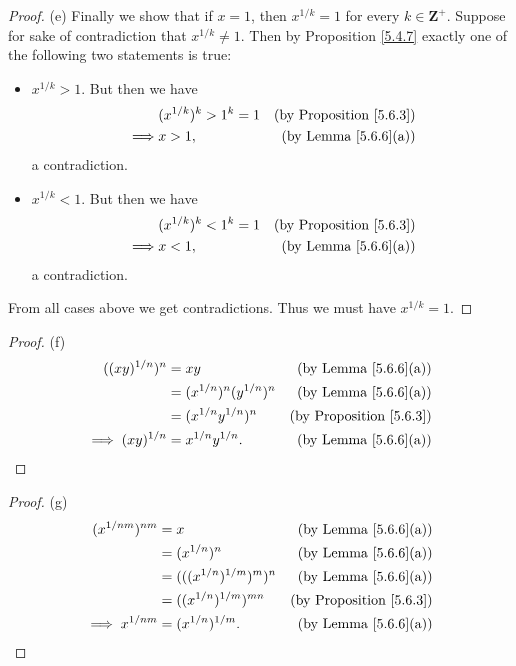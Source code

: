 \begin{proof}{(e)}
    Finally we show that if \(x = 1\), then \(x^{1 / k} = 1\) for every \(k \in \mathbf{Z}^+\).
    Suppose for sake of contradiction that \(x^{1 / k} \neq 1\).
    Then by Proposition \ref{5.4.7} exactly one of the following two statements is true:
    \begin{itemize}
        \item \(x^{1 / k} > 1\).
              But then we have
              \begin{align*}
                           & (x^{1 / k})^k > 1^k = 1 & \text{(by Proposition \ref{5.6.3})} \\
                  \implies & x > 1,                  & \text{(by Lemma \ref{5.6.6}(a))}
              \end{align*}
              a contradiction.
        \item \(x^{1 / k} < 1\).
              But then we have
              \begin{align*}
                           & (x^{1 / k})^k < 1^k = 1 & \text{(by Proposition \ref{5.6.3})} \\
                  \implies & x < 1,                  & \text{(by Lemma \ref{5.6.6}(a))}
              \end{align*}
              a contradiction.
    \end{itemize}
    From all cases above we get contradictions.
    Thus we must have \(x^{1 / k} = 1\).
\end{proof}

\begin{proof}{(f)}
    \begin{align*}
        ((xy)^{1 / n})^n      & = xy                          & \text{(by Lemma \ref{5.6.6}(a))}    \\
                              & = (x^{1 / n})^n (y^{1 / n})^n & \text{(by Lemma \ref{5.6.6}(a))}    \\
                              & = (x^{1 / n} y^{1 / n})^n     & \text{(by Proposition \ref{5.6.3})} \\
        \implies (xy)^{1 / n} & = x^{1 / n} y^{1 / n}.        & \text{(by Lemma \ref{5.6.6}(a))}
    \end{align*}
\end{proof}

\begin{proof}{(g)}
    \begin{align*}
        (x^{1 / nm})^{nm}   & = x                           & \text{(by Lemma \ref{5.6.6}(a))}    \\
                            & = (x^{1 / n})^n               & \text{(by Lemma \ref{5.6.6}(a))}    \\
                            & = (((x^{1 / n})^{1 / m})^m)^n & \text{(by Lemma \ref{5.6.6}(a))}    \\
                            & = ((x^{1 / n})^{1 / m})^{mn}  & \text{(by Proposition \ref{5.6.3})} \\
        \implies x^{1 / nm} & = (x^{1 / n})^{1 / m}.        & \text{(by Lemma \ref{5.6.6}(a))}
    \end{align*}
\end{proof}

